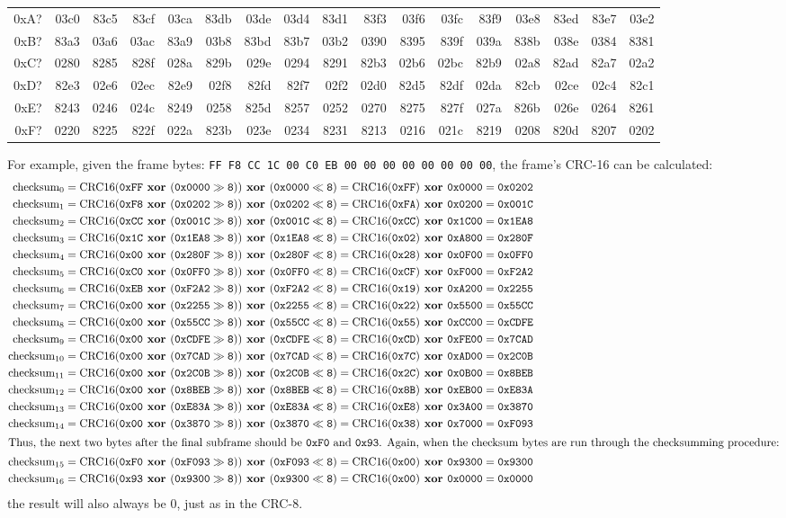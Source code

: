 \begin{table}[h]
{\begin{tabular}{|r||r|r|r|r|r|r|r|r|r|r|r|r|r|r|r|r|}
0xA? & 03c0 & 83c5 & 83cf & 03ca & 83db & 03de & 03d4 & 83d1 & 83f3 & 03f6 & 03fc & 83f9 & 03e8 & 83ed & 83e7 & 03e2 \\
0xB? & 83a3 & 03a6 & 03ac & 83a9 & 03b8 & 83bd & 83b7 & 03b2 & 0390 & 8395 & 839f & 039a & 838b & 038e & 0384 & 8381 \\
0xC? & 0280 & 8285 & 828f & 028a & 829b & 029e & 0294 & 8291 & 82b3 & 02b6 & 02bc & 82b9 & 02a8 & 82ad & 82a7 & 02a2 \\
0xD? & 82e3 & 02e6 & 02ec & 82e9 & 02f8 & 82fd & 82f7 & 02f2 & 02d0 & 82d5 & 82df & 02da & 82cb & 02ce & 02c4 & 82c1 \\
0xE? & 8243 & 0246 & 024c & 8249 & 0258 & 825d & 8257 & 0252 & 0270 & 8275 & 827f & 027a & 826b & 026e & 0264 & 8261 \\
0xF? & 0220 & 8225 & 822f & 022a & 823b & 023e & 0234 & 8231 & 8213 & 0216 & 021c & 8219 & 0208 & 820d & 8207 & 0202 \\
\hline
\end{tabular}
}
\end{table}
\par
\noindent
For example, given the frame bytes:
\texttt{FF F8 CC 1C 00 C0 EB 00 00 00 00 00 00 00 00},
the frame's CRC-16 can be calculated:
{
\begin{align*}
\CRCSIXTEEN{0}{0xFF}{0x0000}{0xFF}{0x0000}{0x0202} \\
\CRCSIXTEEN{1}{0xF8}{0x0202}{0xFA}{0x0200}{0x001C} \\
\CRCSIXTEEN{2}{0xCC}{0x001C}{0xCC}{0x1C00}{0x1EA8} \\
\CRCSIXTEEN{3}{0x1C}{0x1EA8}{0x02}{0xA800}{0x280F} \\
\CRCSIXTEEN{4}{0x00}{0x280F}{0x28}{0x0F00}{0x0FF0} \\
\CRCSIXTEEN{5}{0xC0}{0x0FF0}{0xCF}{0xF000}{0xF2A2} \\
\CRCSIXTEEN{6}{0xEB}{0xF2A2}{0x19}{0xA200}{0x2255} \\
\CRCSIXTEEN{7}{0x00}{0x2255}{0x22}{0x5500}{0x55CC} \\
\CRCSIXTEEN{8}{0x00}{0x55CC}{0x55}{0xCC00}{0xCDFE} \\
\CRCSIXTEEN{9}{0x00}{0xCDFE}{0xCD}{0xFE00}{0x7CAD} \\
\CRCSIXTEEN{10}{0x00}{0x7CAD}{0x7C}{0xAD00}{0x2C0B} \\
\CRCSIXTEEN{11}{0x00}{0x2C0B}{0x2C}{0x0B00}{0x8BEB} \\
\CRCSIXTEEN{12}{0x00}{0x8BEB}{0x8B}{0xEB00}{0xE83A} \\
\CRCSIXTEEN{13}{0x00}{0xE83A}{0xE8}{0x3A00}{0x3870} \\
\CRCSIXTEEN{14}{0x00}{0x3870}{0x38}{0x7000}{0xF093} \\
\intertext{Thus, the next two bytes after the final subframe should be
\texttt{0xF0} and \texttt{0x93}.
Again, when the checksum bytes are run through the checksumming procedure:}
\CRCSIXTEEN{15}{0xF0}{0xF093}{0x00}{0x9300}{0x9300} \\
\CRCSIXTEEN{16}{0x93}{0x9300}{0x00}{0x0000}{0x0000}
\end{align*}
the result will also always be 0, just as in the CRC-8.
}
